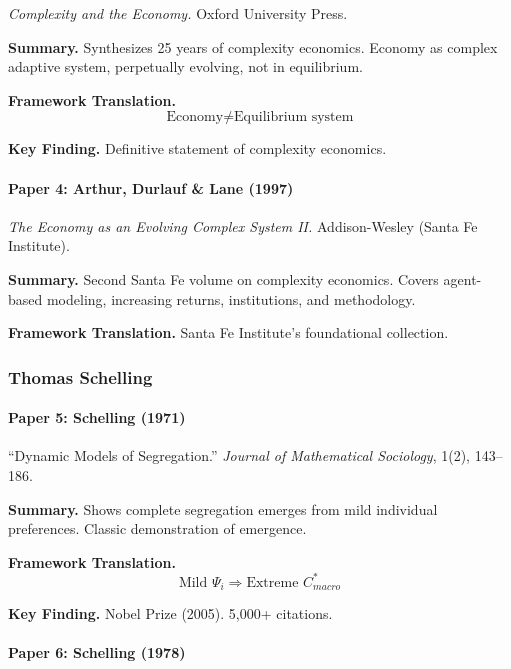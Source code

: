 \textit{Complexity and the Economy.}
Oxford University Press.

\textbf{Summary.}
Synthesizes 25 years of complexity economics. Economy as complex 
adaptive system, perpetually evolving, not in equilibrium.

\textbf{Framework Translation.}
\begin{equation}
\text{Economy} \neq \text{Equilibrium system}
\end{equation}

\textbf{Key Finding.}
Definitive statement of complexity economics.

\paragraph{Paper 4: Arthur, Durlauf \& Lane (1997)}

\textit{The Economy as an Evolving Complex System II.}
Addison-Wesley (Santa Fe Institute).

\textbf{Summary.}
Second Santa Fe volume on complexity economics. Covers agent-based modeling, 
increasing returns, institutions, and methodology.

\textbf{Framework Translation.}
Santa Fe Institute's foundational collection.

\subsubsection{Thomas Schelling}

\paragraph{Paper 5: Schelling (1971)}

``Dynamic Models of Segregation.''
\textit{Journal of Mathematical Sociology}, 1(2), 143--186.

\textbf{Summary.}
Shows complete segregation emerges from mild individual preferences.
Classic demonstration of emergence.

\textbf{Framework Translation.}
\begin{equation}
\text{Mild } \Psi_i \Rightarrow \text{Extreme } C^*_{macro}
\end{equation}

\textbf{Key Finding.}
Nobel Prize (2005). 5,000+ citations.

\paragraph{Paper 6: Schelling (1978)}

